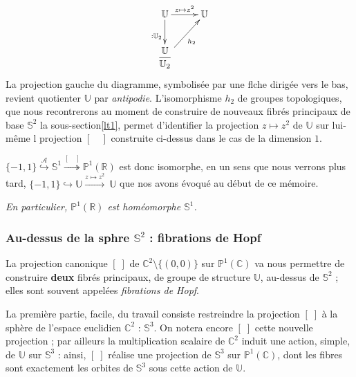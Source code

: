 \[\xymatrix{%
\mathbb{U} \ar[r]^{z\mapsto z^2} \ar[d]_{:\mathbb{U}_2}&\mathbb{U}\\%
\dfrac{\mathbb{U}}{\mathbb{U}_2} \ar[ru]_{h_2}&%
}\]
La projection  gauche du diagramme, symbolis\'ee par une flche dirig\'ee vers le bas, revient  quotienter $\mathbb{U}$ par \emph{antipodie}. %
L'isomorphisme $h_2$ de groupes topologiques, que nous recontrerons au moment de construire de nouveaux fibr\'es principaux de base $\mathbb{S}^2$  la sous-section\ref{lt1}, %
permet d'identifier la projection $z\mapsto z^2$ de $\mathbb{U}$ sur lui-m\^eme  l projection $[\quad ]$ construite ci-dessus dans le cas de la dimension $1$.

\par
$\{-1,1\} \overset{\mathcal{A}}{\hookrightarrow} \mathbb{S}^1 \overset{[\quad]}{\twoheadrightarrow} \mathbb{P}^1(\mathbb{R})$ est donc isomorphe, %
en un sens que nous verrons plus tard,  $\{-1,1\}\hookrightarrow\mathbb{U}\xrightarrow{z\mapsto z^2}~\mathbb{U}$ que nos avons \'evoqu\'e au d\'ebut de ce m\'emoire.

\par
\emph{En particulier, $\mathbb{P}^1(\mathbb{R})$ est hom\'eomorphe  $\mathbb{S}^1$.}

\subsubsection{Au-dessus de la sphre $\mathbb{S}^2$ : fibrations de Hopf}

La projection canonique $[\;]$ de $\mathbb{C}^2\setminus\{(0,0)\}$ sur $\mathbb{P}^1(\mathbb{C})$ va nous permettre de construire %
\textbf{deux} fibr\'es principaux, de groupe de structure $\mathbb{U}$, au-dessus de $\mathbb{S}^2$ ; elles sont souvent appel\'ees \emph{fibrations de Hopf}.

\par
La premi\`ere partie, facile, du travail consiste  restreindre la projection $[\; ]$ \`a la sph\`ere de l'espace euclidien $\mathbb{C}^2$ : $\mathbb{S}^3$. %
On notera encore $[\; ]$ cette nouvelle projection ; par ailleurs la multiplication scalaire de $\mathbb{C}^2$ induit une action, simple, de $\mathbb{U}$ sur $\mathbb{S}^3$ : %
ainsi, $[\;]$ r\'ealise une projection de $\mathbb{S}^3$ sur $\mathbb{P}^1(\mathbb{C})$, %
dont les fibres sont exactement les orbites de $\mathbb{S}^3$ sous cette action de $\mathbb{U}$.

